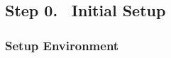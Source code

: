 \documentclass[12pt]{article}
\renewcommand{\_}{\kern-1.5pt\textunderscore\kern-1.5pt}
\begin{document}
\renewcommand\thesubsection{Step \arabic{subsection}.}
\renewcommand\thesubsubsection{\arabic{subsubsection}.}

\subsection*{Step 0. \(\;\;\)Initial Setup}

\subsubsection{Setup Environment}







\end{document}
